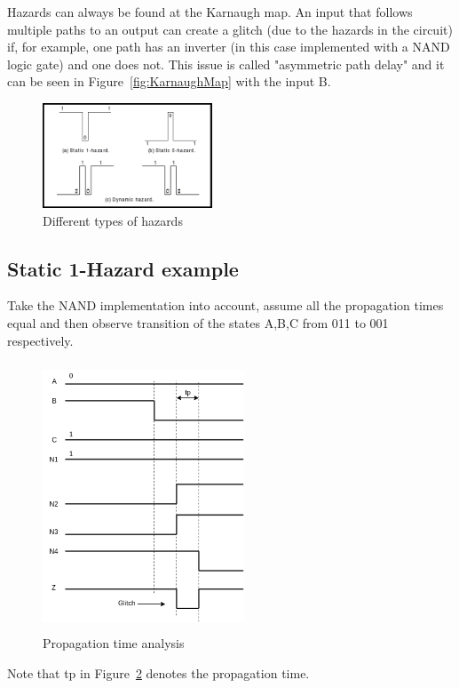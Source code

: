 Hazards can always be found at the Karnaugh map.
An input that follows multiple paths to an output can create a glitch (due to the hazards in the circuit) if, for example, 
one path has an inverter (in this case implemented with a NAND logic gate) 
and one does not. This issue is called "asymmetric path delay" and it can be
seen in Figure~\ref{fig:KarnaughMap} with the input B. 

\begin{figure}[H] 
    \begin{center}
    \includegraphics[width=0.45\textwidth]{data/hazard.png}
    \end{center}
    \caption{Different types of hazards}
    \label{fig:hazards}
    \end{figure} 



 \subsection*{Static 1-Hazard example} 
 Take the NAND implementation into account, assume all the propagation times 
 equal and then observe transition of the states A,B,C from 011 to 001 respectively.


\begin{figure}[H] 
    \begin{center}
    \includegraphics[width=6cm,height=8cm]{data/glitch.png}
    \end{center}
    \caption{Propagation time analysis}
    \label{fig:proptime}
    \end{figure} 
Note that tp in Figure~\ref{fig:proptime}  denotes the propagation time.

